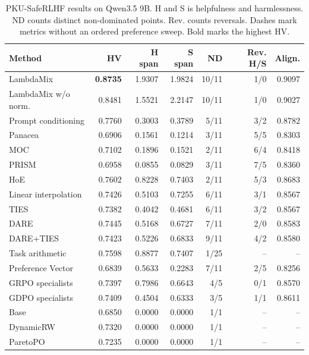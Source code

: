 \begin{table}[htbp]
\centering\small
\setlength{\tabcolsep}{3pt}
\caption{PKU-SafeRLHF results on Qwen3.5 9B. H and S is helpfulness and harmlessness. ND counts distinct non-dominated points. Rev. counts reversals. Dashes mark metrics without an ordered preference sweep. Bold marks the highest HV.}
\label{tab:full-pku-q9}
\begin{tabular}{@{}lrrrrrr@{}}
\toprule
Method & HV & H span & S span & ND & Rev. H/S & Align.\\
\midrule
LambdaMix & \textbf{0.8735} & 1.9307 & 1.9824 & 10/11 & 1/0 & 0.9097\\
LambdaMix w/o norm. & 0.8481 & 1.5521 & 2.2147 & 10/11 & 1/0 & 0.9027\\
\midrule
Prompt conditioning & 0.7760 & 0.3003 & 0.3789 & 5/11 & 3/2 & 0.8782\\
Panacea & 0.6906 & 0.1561 & 0.1214 & 3/11 & 5/5 & 0.8303\\
MOC & 0.7102 & 0.1896 & 0.1521 & 2/11 & 6/4 & 0.8418\\
PRISM & 0.6958 & 0.0855 & 0.0829 & 3/11 & 7/5 & 0.8360\\
HoE & 0.7602 & 0.8228 & 0.7403 & 2/11 & 5/3 & 0.8683\\
\midrule
Linear interpolation & 0.7426 & 0.5103 & 0.7255 & 6/11 & 3/1 & 0.8567\\
TIES & 0.7382 & 0.4042 & 0.4681 & 6/11 & 3/2 & 0.8567\\
DARE & 0.7445 & 0.5168 & 0.6727 & 7/11 & 2/0 & 0.8583\\
DARE+TIES & 0.7423 & 0.5226 & 0.6833 & 9/11 & 4/2 & 0.8580\\
Task arithmetic & 0.7598 & 0.8877 & 0.7407 & 1/25 & -- & --\\
Preference Vector & 0.6839 & 0.5633 & 0.2283 & 7/11 & 2/5 & 0.8256\\
\midrule
GRPO specialists & 0.7397 & 0.7986 & 0.6643 & 4/5 & 0/1 & 0.8570\\
GDPO specialists & 0.7409 & 0.4504 & 0.6333 & 3/5 & 1/1 & 0.8611\\
\midrule
Base & 0.6850 & 0.0000 & 0.0000 & 1/1 & -- & --\\
DynamicRW & 0.7320 & 0.0000 & 0.0000 & 1/1 & -- & --\\
ParetoPO & 0.7235 & 0.0000 & 0.0000 & 1/1 & -- & --\\
\bottomrule
\end{tabular}
\end{table}

